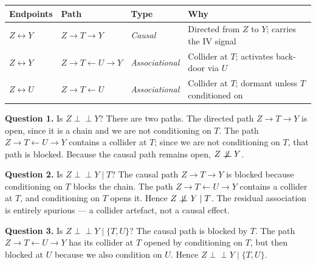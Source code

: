 \documentclass[
  a4paper,
]{book}
\newcounter{none} %
\newcommand{\indep}{\perp\!\!\!\perp}
\newcommand{\nindep}{\centernot{\indep}}
\begin{document}
{\def\LTcaptype{none} %
\begin{longtable}[]{@{}
  >{\raggedright\arraybackslash}p{}
  >{\raggedright\arraybackslash}p{}
  >{\raggedright\arraybackslash}p{}
  >{\raggedright\arraybackslash}p{}@{}}
\toprule\noalign{}
\begin{minipage}[b]{\linewidth}\raggedright
\textbf{Endpoints}
\end{minipage} & \begin{minipage}[b]{\linewidth}\raggedright
\textbf{Path}
\end{minipage} & \begin{minipage}[b]{\linewidth}\raggedright
\textbf{Type}
\end{minipage} & \begin{minipage}[b]{\linewidth}\raggedright
\textbf{Why}
\end{minipage} \\
\midrule\noalign{}
\endhead
\bottomrule\noalign{}
\endlastfoot
\(Z \leftrightarrow Y\) & \(Z \to T \to Y\) & \emph{Causal} & Directed
from \(Z\) to \(Y\); carries the IV signal \\
\(Z \leftrightarrow Y\) & \(Z \to T \leftarrow U \to Y\) &
\emph{Associational} & Collider at \(T\); activates back-door via
\(U\) \\
\(Z \leftrightarrow U\) & \(Z \to T \leftarrow U\) &
\emph{Associational} & Collider at \(T\); dormant unless \(T\)
conditioned on \\
\end{longtable}
}

\textbf{Question 1.} Is \(Z \indep Y\)? There are two paths. The
directed path \(Z \to T \to Y\) is open, since it is a chain and we are
not conditioning on \(T\). The path \(Z \to T \leftarrow U \to Y\)
contains a collider at \(T\); since we are not conditioning on \(T\),
that path is blocked. Because the causal path remains open,
\(Z \nindep Y\).

\textbf{Question 2.} Is \(Z \indep Y \mid T\)? The causal path
\(Z \to T \to Y\) is blocked because conditioning on \(T\) blocks the
chain. The path \(Z \to T \leftarrow U \to Y\) contains a collider at
\(T\), and conditioning on \(T\) opens it. Hence \(Z \nindep Y \mid T\).
The residual association is entirely spurious --- a collider artefact,
not a causal effect.

\textbf{Question 3.} Is \(Z \indep Y \mid \{T, U\}\)? The causal path is
blocked by \(T\). The path \(Z \to T \leftarrow U \to Y\) has its
collider at \(T\) opened by conditioning on \(T\), but then blocked at
\(U\) because we also condition on \(U\). Hence
\(Z \indep Y \mid \{T, U\}\).
\end{document}
